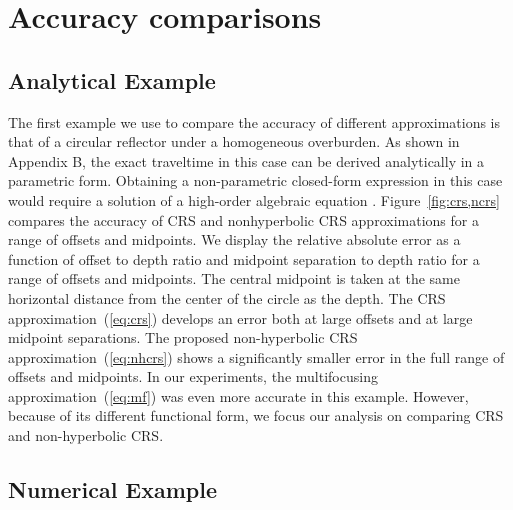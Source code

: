\section{Accuracy comparisons}

\subsection{Analytical Example}


The first example we use to compare the accuracy of different
approximations is that of a circular reflector under a homogeneous
overburden. As shown in Appendix B, the exact traveltime in this case
can be derived analytically in a parametric form. Obtaining a
non-parametric closed-form expression in this case would require a
solution of a high-order algebraic equation \cite[]{sigma}.
Figure~\ref{fig:crs,ncrs} compares the accuracy of CRS and nonhyperbolic
CRS approximations for a range of offsets and midpoints. We display
the relative absolute error as a function of offset to depth ratio and
midpoint separation to depth ratio for a range of offsets and
midpoints. The central midpoint is taken at the same horizontal
distance from the center of the circle as the depth.  The CRS
approximation~(\ref{eq:crs}) develops an error both at large offsets
and at large midpoint separations. The proposed non-hyperbolic CRS
approximation~(\ref{eq:nhcrs}) shows a significantly smaller error in
the full range of offsets and midpoints. In our experiments, the
multifocusing approximation~(\ref{eq:mf}) was even more accurate in
this example. However, because of its different functional form, we
focus our analysis on comparing CRS and non-hyperbolic CRS.

\subsection{Numerical Example}

\newcommand{\parvec}[1]{\textbf{#1}}

